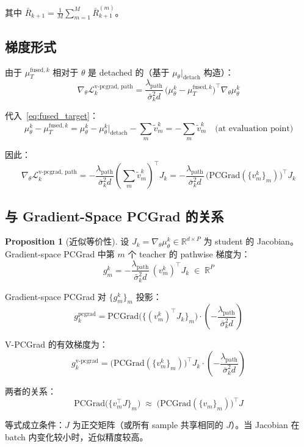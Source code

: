 \documentclass[11pt,a4paper]{article}
\newcommand{\loss}{\mathcal{L}}
\newcommand{\R}{\mathbb{R}}
\newcommand{\mutheta}{\mu_\theta}
\newcommand{\sigbar}{\bar{\sigma}}
\newcommand{\Rbar}{\bar{R}}
\newcommand{\lpath}{\lambda_{\mathrm{path}}}
\newcommand{\detach}{\mathrm{detach}}
\newcommand{\PC}{\mathrm{PCGrad}}
\theoremstyle{definition}
\newtheorem{proposition}{Proposition}
\begin{document}
其中 $\Rbar_{k+1} = \frac{1}{M}\sum_{m=1}^M \Rbar_{k+1}^{(m)}$。

\subsection{梯度形式}

由于 $\mu_T^{\mathrm{fused},k}$ 相对于 $\theta$ 是 detached 的（基于 $\mutheta|_{\detach}$ 构造）：
\begin{equation}
\nabla_\theta \loss_k^{\mathrm{v\text{-}pcgrad,\,path}}
= \frac{\lpath}{\sigbar_k^2 d}\,\bigl(\mutheta^k - \mu_T^{\mathrm{fused},k}\bigr)^\top \nabla_\theta \mutheta^k
\label{eq:grad_vpcgrad}
\end{equation}

代入~\eqref{eq:fused_target}：
\begin{equation}
\mutheta^k - \mu_T^{\mathrm{fused},k}
= \mutheta^k - \mutheta^k\big|_{\detach} - \sum_m \tilde{v}_m^k
= -\sum_m \tilde{v}_m^k
\quad\text{(at evaluation point)}
\end{equation}

因此：
\begin{equation}
\nabla_\theta \loss_k^{\mathrm{v\text{-}pcgrad,\,path}}
= -\frac{\lpath}{\sigbar_k^2 d}\left(\sum_m \tilde{v}_m^k\right)^\top J_k
= -\frac{\lpath}{\sigbar_k^2 d}\,\bigl(\PC(\{v_m^k\}_m)\bigr)^\top J_k
\end{equation}

\subsection{与 Gradient-Space PCGrad 的关系}

\begin{proposition}[近似等价性]
设 $J_k = \nabla_\theta \mutheta^k \in \R^{d \times P}$ 为 student 的 Jacobian。Gradient-space PCGrad 中第 $m$ 个 teacher 的 pathwise 梯度为：
\begin{equation}
g_m^k = -\frac{\lpath}{\sigbar_k^2 d}\,(v_m^k)^\top J_k \;\in\; \R^P
\end{equation}

\noindent Gradient-space PCGrad 对 $\{g_m^k\}_m$ 投影：
\begin{equation}
g^{\mathrm{pcgrad}}_k = \PC\!\bigl(\{(v_m^k)^\top J_k\}_m\bigr) \cdot \left(-\frac{\lpath}{\sigbar_k^2 d}\right)
\end{equation}

\noindent V-PCGrad 的有效梯度为：
\begin{equation}
g^{\mathrm{v\text{-}pcgrad}}_k = \bigl(\PC(\{v_m^k\}_m)\bigr)^\top J_k \cdot \left(-\frac{\lpath}{\sigbar_k^2 d}\right)
\end{equation}

两者的关系：
\begin{equation}
\boxed{
\PC\!\bigl(\{v_m^\top J\}_m\bigr) \;\approx\; \bigl(\PC(\{v_m\}_m)\bigr)^\top J
}
\label{eq:approx_relation}
\end{equation}

等式成立条件：$J$ 为正交矩阵（或所有 sample 共享相同的 $J$）。当 Jacobian 在 batch 内变化较小时，近似精度较高。
\end{proposition}
\end{document}
